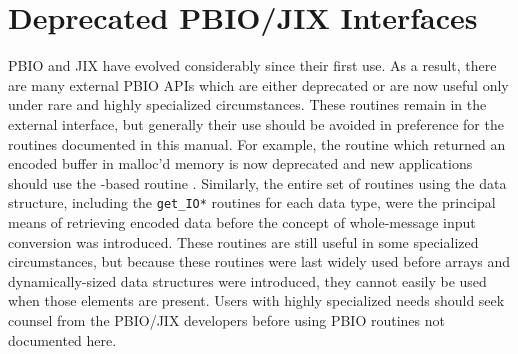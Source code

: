 \section{Deprecated PBIO/JIX Interfaces}
PBIO and JIX have evolved considerably since their first use.  As a result,
there are many external PBIO APIs which are either deprecated or are now
useful only under rare and highly specialized circumstances.  These routines
remain in the external interface, but generally their use should be avoided
in preference for the routines documented in this manual.  For example, the
routine  which returned an
encoded buffer in malloc'd memory is now deprecated and new applications
should use the -based routine
.  Similarly, the entire set of routines
using the  data structure, including the {\tt get\_IO*}
routines for each data type, were the principal means of retrieving encoded
data before the concept of whole-message input conversion was introduced.
These routines are still useful in some specialized circumstances, but
because these routines were last widely used before arrays and
dynamically-sized data structures were introduced, they cannot easily be
used when those elements are present.  Users with highly specialized needs
should seek counsel from the PBIO/JIX developers before using PBIO routines
not documented here.

%
%
\printindex

